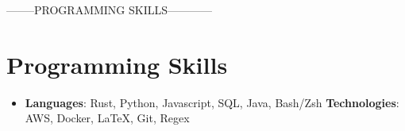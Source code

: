 \documentclass[letterpaper,11pt]{article}
\newcommand{\resumeSubHeadingListStart}{\begin{itemize}[leftmargin=*]}
\newcommand{\resumeSubHeadingListEnd}{\end{itemize}}
\begin{document}
--------PROGRAMMING SKILLS------------
\section{Programming Skills}
 \resumeSubHeadingListStart
   \item{
     \textbf{Languages}{: Rust, Python, Javascript, SQL, Java, Bash/Zsh}
     \hfill
     \textbf{Technologies}{: AWS, Docker, \LaTeX, Git, Regex}
   }
 \resumeSubHeadingListEnd


\end{document}
